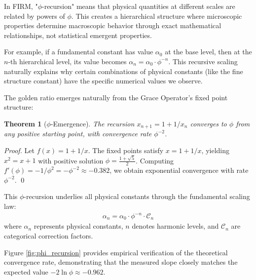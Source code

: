 \documentclass[12pt]{article}
\newtheorem{theorem}{Theorem}
\begin{document}
In FIRM, "$\phi$-recursion" means that physical quantities at different scales are related by powers of $\phi$. This creates a hierarchical structure where microscopic properties determine macroscopic behavior through exact mathematical relationships, not statistical emergent properties.

For example, if a fundamental constant has value $\alpha_0$ at the base level, then at the $n$-th hierarchical level, its value becomes $\alpha_n = \alpha_0 \cdot \phi^{-n}$. This recursive scaling naturally explains why certain combinations of physical constants (like the fine structure constant) have the specific numerical values we observe.

The golden ratio emerges naturally from the Grace Operator's fixed point structure:

\begin{theorem}[$\phi$-Emergence]
\label{thm:phi_emergence}
The recursion $x_{n+1} = 1 + 1/x_n$ converges to $\phi$ from any positive starting point, with convergence rate $\phi^{-2}$.
\end{theorem}

\begin{proof}
Let $f(x) = 1 + 1/x$. The fixed points satisfy $x = 1 + 1/x$, yielding $x^2 = x + 1$ with positive solution $\phi = \frac{1+\sqrt{5}}{2}$. Computing $f'(\phi) = -1/\phi^2 = -\phi^{-2} \approx -0.382$, we obtain exponential convergence with rate $\phi^{-2}$. \qed
\end{proof}

This $\phi$-recursion underlies all physical constants through the fundamental scaling law:
\begin{align}
\alpha_n = \alpha_0 \cdot \phi^{-n} \cdot \mathcal{C}_n
\end{align}
where $\alpha_n$ represents physical constants, $n$ denotes harmonic levels, and $\mathcal{C}_n$ are categorical correction factors.

Figure \ref{fig:phi_recursion} provides empirical verification of the theoretical convergence rate, demonstrating that the measured slope closely matches the expected value $-2 \ln \phi \approx -0.962$.
\end{document}
